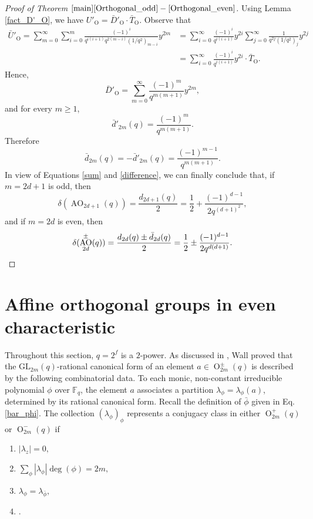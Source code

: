 \documentclass[a4paper, 12pt, oneside]{amsart}
\theoremstyle{definition}
\newcommand{\GL}{\mathrm{GL}}
\DeclareMathOperator{\AO}{AO}
\DeclareMathOperator{\Or}{O}
\begin{document}
\begin{proof}[Proof of Theorem $\ref{main}\eqref{Orthogonal_odd}-\eqref{Orthogonal_even}$]
Using Lemma \ref{fact_D'_O}, we have $U'_{\Or}=\bar{D}'_{\Or}\cdot \bar{T}_{\Or}$. Observe that
\begin{align*}
\bar{U}'_{\Or}=\sum_{m=0}^{\infty}\sum_{i=0}^{m}\frac{(-1)^{i}}{q^{i(i+1)}q^{2(m-i)}(1/q^2)_{m-i}}y^{2m}&=\sum_{i=0}^{\infty}\frac{(-1)^i}{q^{i(i+1)}}y^{2i}\sum_{j=0}^{\infty}\frac{1}{q^{2j}(1/q^2)_j}y^{2j}\\
& =\sum_{i=0}^{\infty}\frac{(-1)^i}{q^{i(i+1)}}y^{2i}\cdot \bar{T}_{\Or}.
\end{align*}
Hence, 
$$\bar{D}'_{\Or}=\sum_{m=0}^{\infty}\frac{(-1)^m}{q^{m(m+1)}}y^{2m},$$
and for every $m \ge 1$,
$$\bar{d}'_{2m}(q)=\frac{(-1)^m}{q^{m(m+1)}}.$$
Therefore
\begin{equation}
\label{difference}
\bar{d}_{2m}(q)=-\bar{d}'_{2m}(q)=\frac{(-1)^{m-1}}{q^{m(m+1)}}.
\end{equation}
In view of Equations \eqref{sum} and \eqref{difference}, we can finally conclude that, if $m=2d+1$ is odd, then
$$\delta(\AO_{2d+1}(q))=\frac{d_{2d+1}(q)}{2}=\frac{1}{2}+\frac{(-1)^{d-1}}{2q^{(d+1)^2}},$$
and if $m=2d$ is even, then
\begin{equation*}
\delta(\AO^{\pm}_{2d}(q))=\frac{d_{2d}(q)\pm\bar{d}_{2d}(q)}{2}=\frac{1}{2}\pm \frac{(-1)^{d-1}}{2q^{d(d+1)}}.
\qedhere
\end{equation*}
\end{proof}

\section{Affine orthogonal groups in even characteristic}
Throughout this section, $q=2^f$ is a $2$-power.
As discussed in \cite[Sec. 4]{FulmanSaxlTiep12}, Wall \cite{Wall} proved that the $\GL_{2m}(q)$-rational canonical form of an element $a \in \Or_{2m}^{\pm}(q)$ is described by the following combinatorial data.
To each monic, non-constant irreducible polynomial $\phi$ over $\mathbb{F}_q$, the element $a$ associates a partition $\lambda_{\phi}=\lambda_{\phi}(a)$, determined by its rational canonical form. Recall the definition of $\bar{\phi}$ given in Eq. \eqref{bar_phi}. The collection $(\lambda_{\phi})_{\phi}$ represents a conjugacy class in either $\Or_{2m}^{+}(q)$ or $\Or_{2m}^{-}(q)$ if 
\begin{enumerate}[label=(\roman*)]
    \item $|\lambda_z|=0,$
    \item $\sum_{\phi} |\lambda_{\phi}|\deg (\phi)=2m,$
    \item $\lambda_{\phi}=\lambda_{\bar{\phi}},$
    \item {}.
\end{enumerate}
\end{document}
